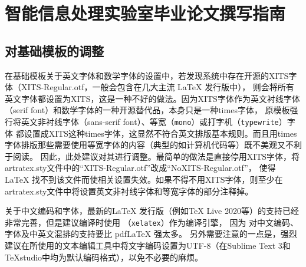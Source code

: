 
\newcommand*{\ltxcmdname}[1]{\texttt{\textbackslash #1}}
\newcommand*{\ltxenvname}[1]{\texttt{#1}}
\newcommand*{\dif}{\mathop{}\!\mathrm{d}}
\newcommand*{\tc}[1]{\multicolumn{1}{c|}{#1}} %

\newcommand*{\figref}[1]{图~\ref{#1}~}
\newcommand*{\secref}[1]{~\ref{#1}~节}
\newcommand*{\tabref}[1]{表~\ref{#1}~}
\newcommand*{\algoref}[1]{算法~\ref{#1}~} %
\newcommand*{\codref}[1]{程序~\ref{#1}~}
\newcommand*{\thmref}[1]{定理~\ref{#1}~}
\newcommand*{\axmref}[1]{公理~\ref{#1}~}
\newcommand*{\lemref}[1]{引理~\ref{#1}~}
\newcommand*{\prpref}[1]{命题~\ref{#1}~}
\newcommand*{\defref}[1]{定义~\ref{#1}~}

\newcommand*{\ntcite}[1]{~\cite{#1}~}
\newcommand*{\npcite}[1]{\textsuperscript{\cite{#1}}}

\chapter{智能信息处理实验室毕业论文撰写指南}

\section{对基础模板的调整}

在基础模板关于英文字体和数学字体的设置中，若发现系统中存在开源的XITS字体（XITS-Regular.otf，一般会包含在几大主流 \LaTeX{} 发行版中），
则会将所有英文字体都设置为XITS，这是一种不好的做法。因为XITS字体作为英文衬线字体（serif font）和数学字体的一种开源替代品，本身只是一种times字体，
原模板强行将英文非衬线字体（\textsf{sans-serif font}）、等宽（\texttt{mono}）或打字机（\texttt{typewrite}）字体
都设置成XITS这种times字体，这显然不符合英文排版基本规则。而且用times字体排版那些需要使用等宽字体的内容（典型的如计算机代码等）既不美观又不利于阅读。
因此，此处建议对其进行调整。最简单的做法是直接停用XITS字体，将artratex.sty文件中的“XITS-Regular.otf”改成“NoXITS-Regular.otf”，
使得 \LaTeX{} 找不到该文件而使相关设置失效。如果不得不用XITS字体，则至少在artratex.sty文件中将设置英文非衬线字体和等宽字体的部分注释掉。

关于中文编码和字体，最新的\LaTeX{} 发行版（例如TeX Live 2020等）的支持已经非常完善，但是建议编译时使用 \XeLaTeX{} （\texttt{xelatex}）作为编译引擎，
因为 \XeLaTeX{} 对中文编码、字体及中英文混排的支持要比 pdfLaTeX 强太多。
另外需要注意的一点是，强烈建议在所使用的文本编辑工具中将文字编码设置为UTF-8（在Sublime Text 3和TeXstudio中均为默认编码格式），以免不必要的麻烦。

